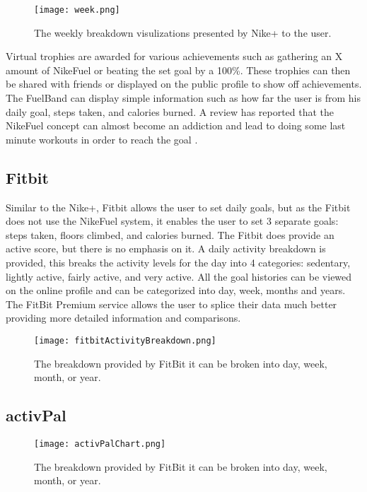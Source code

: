 \begin{figure}[h!]
	\centering
		\texttt{[image: week.png]}
		\caption{\footnotesize The weekly breakdown visulizations presented by Nike+ to the user. \cite{fuelbandTechSpce}}
		\label{fig:activityBreakdown}
\end{figure}

Virtual trophies are awarded for various achievements such as gathering an X amount of NikeFuel or beating the set goal by a 100\%. These trophies can then be shared with friends or displayed on the public profile to show off achievements. The FuelBand can display simple information such as how far the user is from his daily goal, steps taken, and calories burned. A review has reported that the NikeFuel concept can almost become an addiction and lead to doing some last minute workouts in order to reach the goal \cite{fuelbandDcRain}.

\subsection{Fitbit}
Similar to the Nike+, Fitbit allows the user to set daily goals, but as the Fitbit does not use the NikeFuel system, it enables the user to set 3 separate goals: steps taken, floors climbed, and calories burned. The Fitbit does provide an active score, but there is no emphasis on it. A daily activity breakdown is provided, this breaks the activity levels for the day into 4 categories: sedentary, lightly active, fairly active, and very active. All the goal histories can be viewed on the online profile and can be categorized into day, week, months and years. The FitBit Premium service allows the user to splice their data much better providing more detailed information and comparisons. 

\begin{figure}[h!]
	\centering
		\texttt{[image: fitbitActivityBreakdown.png]}
		\caption{\footnotesize The breakdown provided by FitBit it can be broken into day, week, month, or year.}
		\label{fig:fitbitActivityBreakdown}
\end{figure}

\subsection{activPal}


\begin{figure}[h!]
	\centering
		\texttt{[image: activPalChart.png]}
		\caption{\footnotesize The breakdown provided by FitBit it can be broken into day, week, month, or year.}
		\label{fig:fitbitActivityBreakdown}
\end{figure}

